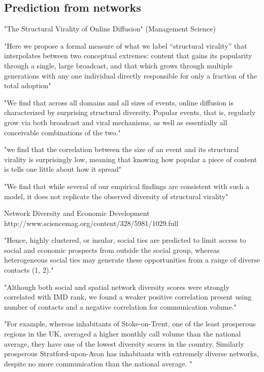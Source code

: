 \subsection{Prediction from networks}

"The Structural Virality of Online Diffusion" (Management Science)




"Here we propose a formal measure of what we label “structural virality” that interpolates between two conceptual extremes: content that gains its popularity through a single, large broadcast, and that which grows through multiple generations with any one individual directly responsible for only a fraction of the total adoption"

"We find that across all domains and all sizes of events, online diffusion is characterized by surprising structural diversity. Popular events, that is, regularly grow via both broadcast and viral mechanisms, as well as essentially all conceivable combinations of the two."

"we find that the correlation between the size of an event and its structural virality is surprisingly low, meaning that knowing how popular a piece of content is tells one little about how it spread"

"We find that while several of our empirical findings are consistent with such a model, it does not replicate the observed diversity of structural virality"











Network Diversity and Economic Development
http://www.sciencemag.org/content/328/5981/1029.full



"Hence, highly clustered, or insular, social ties are predicted to limit access to social and economic prospects from outside the social group, whereas heterogeneous social ties may generate these opportunities from a range of diverse contacts (1, 2)."

"Although both social and spatial network diversity scores were strongly correlated with IMD rank, we found a weaker positive correlation present using number of contacts and a negative correlation for communication volume."

"For example, whereas inhabitants of Stoke-on-Trent, one of the least prosperous regions in the UK, averaged a higher monthly call volume than the national average, they have one of the lowest diversity scores in the country. Similarly prosperous Stratford-upon-Avon has inhabitants with extremely diverse networks, despite no more communication than the national average. "




